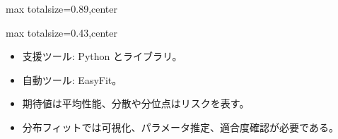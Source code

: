 \begin{minipage}[t]{0.58\textwidth}
\begin{adjustbox}{max totalsize={\textwidth}{0.89\textheight},center}
\begin{minipage}{\textwidth}
\end{minipage}
\end{adjustbox}
\end{minipage}


\clearpage
{}
\begin{minipage}[t]{0.405\textwidth}
\begin{adjustbox}{max totalsize={\textwidth}{0.43\textheight},center}
\begin{minipage}{\textwidth}\scriptsize
{}\begin{itemize}
\item 支援ツール: Python とライブラリ。
\item 自動ツール: EasyFit。
\end{itemize}\begin{itemize}
\item 期待値は平均性能、分散や分位点はリスクを表す。
\item 分布フィットでは可視化、パラメータ推定、適合度確認が必要である。
\end{itemize}
\end{minipage}
\end{adjustbox}
\end{minipage}\hfill
